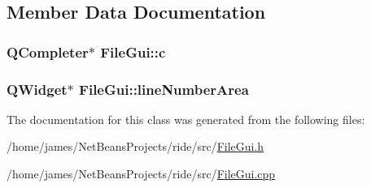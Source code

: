 \subsection{Member Data Documentation}
\hypertarget{class_file_gui_a71dfac2e67bf84af494667901b51ddc9}{
\subsubsection[{c}]{\setlength{\rightskip}{0pt plus 5cm}Q\-Completer$\ast$ File\-Gui\-::c\hspace{0.3cm}{\ttfamily [private]}}}\label{class_file_gui_a71dfac2e67bf84af494667901b51ddc9}
\hypertarget{class_file_gui_a4fa030b7bda34eeb961eac7324f28b88}{
\subsubsection[{line\-Number\-Area}]{\setlength{\rightskip}{0pt plus 5cm}Q\-Widget$\ast$ File\-Gui\-::line\-Number\-Area\hspace{0.3cm}{\ttfamily [private]}}}\label{class_file_gui_a4fa030b7bda34eeb961eac7324f28b88}


The documentation for this class was generated from the following files\-:\begin{DoxyCompactItemize}
\item 
/home/james/\-Net\-Beans\-Projects/ride/src/\hyperlink{_file_gui_8h}{File\-Gui.\-h}\item 
/home/james/\-Net\-Beans\-Projects/ride/src/\hyperlink{_file_gui_8cpp}{File\-Gui.\-cpp}\end{DoxyCompactItemize}
